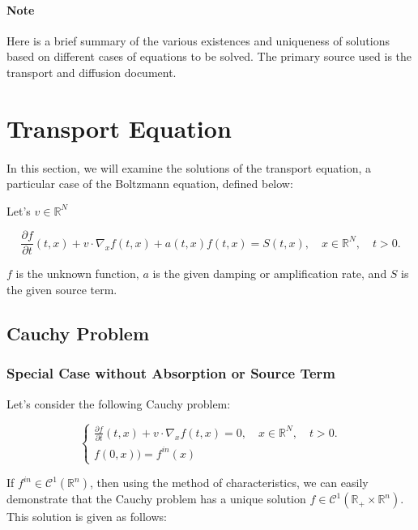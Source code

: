 \documentclass[onecolumn, 12pt, a4paper]{article}
\begin{document}
	
	\newpage
	
	\paragraph{Note} Here is a brief summary of the various existences and uniqueness of solutions based on different cases of equations to be solved. The primary source used is the transport and diffusion document.
	
	\section{Transport Equation}
	
	\paragraph{}
	In this section, we will examine the solutions of the transport equation, a particular case of the Boltzmann equation, defined below:
	
	
	
	Let's $v \in \mathbb{R}^N$
	
	\begin{equation} \label{transport}
		\frac{\partial f}{\partial t}(t,x)+v \cdot \nabla_x f(t,x) + a(t,x)f(t,x) = S(t,x), \quad x \in \mathbb{R}^N, \quad t>0.
	\end{equation}
	
	
	$f$ is the unknown function, $a$ is the given damping or amplification rate, and $S$ is the given source term.
	
	\subsection{Cauchy Problem}
	\subsubsection{Special Case without Absorption or Source Term}
	
	Let's consider the following Cauchy problem:
	
	\[
	\begin{cases}
		\frac{\partial f}{\partial t}(t,x)+v \cdot \nabla_x f(t,x)=0, \quad x \in \mathbb{R}^N, \quad t>0.\\
		f(0,x)) = f^{in}(x)
	\end{cases}
	\]
	
	If $f^{in} \in \mathcal{C}^1(\mathbb{R}^n)$, then using the method of characteristics, we can easily demonstrate that the Cauchy problem has a unique solution $f \in \mathcal{C}^1(\mathbb{R}_+ \times \mathbb{R}^n)$. This solution is given as follows:
	
\end{document}
